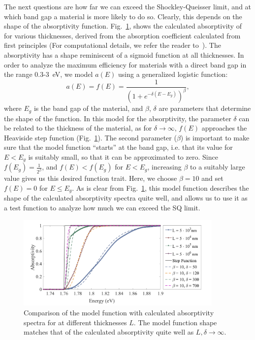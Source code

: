 \begin{refsection}
The next questions are how far we can exceed the Shockley-Queisser limit, and 
at which band gap a material is more likely to do so. Clearly, this depends on the shape of the absorptivity function. Fig.~\ref{slme:fig-step}, 
shows the calculated absorptivity of  for various thicknesses, 
derived from the absorption coefficient calculated from first principles (For 
computational details, we refer the reader to~\cite{Sarmadian2016}). 
The absorptivity has a shape reminiscent of a sigmoid function at all thicknesses. In 
order to analyze the maximum efficiency for materials with a direct band gap 
in the range 0.3-3~\si{\electronvolt}, we model $a(E)$ using a generalized 
logistic function: 
\begin{equation} 
a(E) = f(E) = \frac{1}{(1+e^{-\delta (E - E_g)})^{\beta}}, 
\end{equation} 
where $E_g$ is the band gap of the material, and $\beta$, $\delta$ are 
parameters that determine the shape of the function. In this model for the 
absorptivity, the parameter $\delta$ can be related to the thickness of the 
material, as for $\delta\rightarrow\infty$, $f(E)$ approaches the Heaviside 
step function (Fig.~\ref{slme:fig-step}). The second parameter ($\beta$) is 
important to make sure that the model function ``starts'' at the band gap, 
i.e. that its value for $E < E_g$ is suitably small, so that it can be 
approximated to zero. Since $f(E_g) = \frac{1}{2^\beta}$, and $f(E) < f(E_g)$ 
for $E < E_g$, increasing $\beta$ to a suitably large value gives us this 
desired function trait. Here, we choose $\beta = 10$ and set $f(E) = 0$ for $E 
\leq E_g$. As is clear from Fig.~\ref{slme:fig-step}, this model function 
describes the shape of the calculated absorptivity spectra quite well, and 
allows us to use it as a test function to analyze how much we can exceed the 
SQ limit. 
 
\begin{figure}[ht] 
\centering 
\captionsetup{width=0.9\textwidth}
\includegraphics[width=0.9\textwidth]{Figures/slme/sq_Fig2.png} 
\caption{Comparison of the model function with calculated absorptivity spectra 
for  at different thicknesses $L$. The model function shape 
matches that of the calculated absorptivity quite well as $L,\delta 
\rightarrow \infty$.} 
\label{slme:fig-step} 
\end{figure} 
 

\end{refsection}

